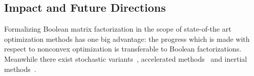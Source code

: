 \subsection{Impact and Future Directions}
Formalizing Boolean matrix factorization in the scope of state-of-the art optimization methods has one big advantage: the progress which is made with respect to nonconvex optimization is transferable to Boolean factorizations. Meanwhile there exist stochastic variants~\citep{davis2016sound}, accelerated methods~\citep{li2015accelerated} and inertial methods~\citep{pock2016inertial}.

